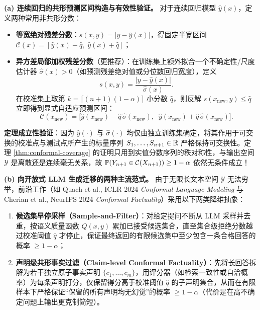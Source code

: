 
\textbf{(a) 连续回归的共形预测区间构造与有效性验证。}
对于连续回归模型 $\hat{y}(x)$，定义两种常用非共形分数：
\begin{itemize}
  \item \textbf{等宽绝对残差分数}：$s(x, y) = |y - \hat{y}(x)|$，得固定半宽区间 $\mathcal{C}(x) = [\hat{y}(x) - \hat{q},\; \hat{y}(x) + \hat{q}]$；
  \item \textbf{异方差局部加权残差分数}（更推荐）：在训练集上额外拟合一个不确定性/尺度估计器 $\hat{\sigma}(x) > 0$（如预测残差绝对值或分位数回归宽度），定义
  \[
    s(x, y) = \frac{|y - \hat{y}(x)|}{\hat{\sigma}(x)}.
  \]
  在校准集上取第 $k = \lceil(n+1)(1-\alpha)\rceil$ 小分数 $\hat{q}$，则反解 $s(x_{\text{new}}, y) \le \hat{q}$ 立即得到显式自适应预测区间：
  \[
    \mathcal{C}(x_{\text{new}}) = \Big[\hat{y}(x_{\text{new}}) - \hat{q}\,\hat{\sigma}(x_{\text{new}}),\;\; \hat{y}(x_{\text{new}}) + \hat{q}\,\hat{\sigma}(x_{\text{new}})\Big].
  \]
\end{itemize}
\textbf{定理成立性验证}：因为 $\hat{y}(\cdot)$ 与 $\hat{\sigma}(\cdot)$ 均仅由独立训练集确定，将其作用于可交换的校准点与测试点所产生的标量序列 $S_1,\dots,S_{n+1} \in \mathbb{R}$ 严格保持可交换性。定理 \ref{thm:conformal-coverage} 的证明只用到实值分数序列的秩对称性，与输出空间 $\mathcal{Y}$ 是离散还是连续毫无关系，故 $\mathbb{P}(Y_{n+1} \in \mathcal{C}(X_{n+1})) \ge 1 - \alpha$ 依然无条件成立！

\textbf{(b) 向开放式 LLM 生成迁移的两种主流范式。}
由于无限长文本空间 $\mathcal{Y}$ 无法穷举，前沿工作（如 Quach et al., ICLR 2024 \emph{Conformal Language Modeling} 与 Cherian et al., NeurIPS 2024 \emph{Conformal Factuality}）采用以下两类降维抽象：
\begin{enumerate}
  \item \textbf{候选集早停采样（Sample-and-Filter）}：对给定提问不断从 LLM 采样并去重，按语义质量函数 $Q(x, y)$ 累加已接受候选集合，直至集合级拒绝分数越过校准阈值 $\hat{q}$ 才停止，保证最终返回的有限候选集中至少包含一条合格回答的概率 $\ge 1 - \alpha$；
  \item \textbf{声明级共形事实过滤（Claim-level Conformal Factuality）}：先将长回答拆解为若干独立原子事实声明 $\{c_1,\dots,c_m\}$，用评分器（如检索一致性或自洽概率）为每条声明打分，仅保留得分高于校准阈值 $\hat{q}$ 的子声明集合，从而在有限样本下严格保证“保留的所有声明均无幻觉”的概率 $\ge 1 - \alpha$（代价是在高不确定问题上输出更克制简短）。
\end{enumerate}


